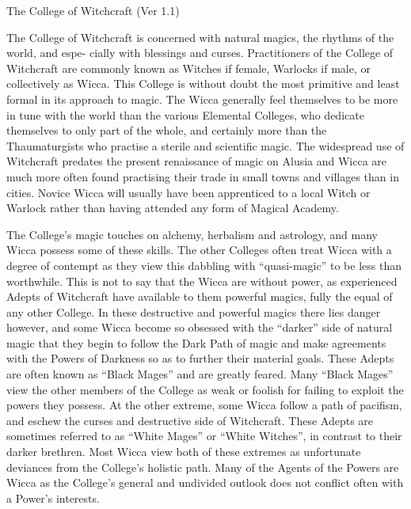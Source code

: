 \begin{Chapter}{The College of Witchcraft (Ver 1.1)}

The College of Witchcraft is concerned with natural magics, the
rhythms of the world, and espe- cially with blessings and curses.
Practitioners of the College of Witchcraft are commonly known as
Witches if female, Warlocks if male, or collectively as Wicca. This
College is without doubt the most primitive and least formal in its
approach to magic.  The Wicca generally feel themselves to be more in
tune with the world than the various Elemental Colleges, who dedicate
themselves to only part of the whole, and certainly more than the
Thaumaturgists who practise a sterile and scientific magic.  The
widespread use of Witchcraft predates the present renaissance of magic
on Alusia and Wicca are much more often found practising their trade
in small towns and villages than in cities.  Novice Wicca will usually
have been apprenticed to a local Witch or Warlock rather than having
attended any form of Magical Academy.

The College’s magic touches on alchemy, herbalism and astrology, and
many Wicca possess some of these skills.  The other Colleges often
treat Wicca with a degree of contempt as they view this dabbling with
“quasi-magic” to be less than worthwhile.  This is not to say that the
Wicca are without power, as experienced Adepts of Witchcraft have
available to them powerful magics, fully the equal of any other
College. In these destructive and powerful magics there lies danger
however, and some Wicca become so obsessed with the “darker” side of
natural magic that they begin to follow the Dark Path of magic and
make agreements with the Powers of Darkness so as to further their
material goals. These Adepts are often known as “Black Mages” and are
greatly feared.  Many “Black Mages” view the other members of the
College as weak or foolish for failing to exploit the powers they
possess.  At the other extreme, some Wicca follow a path of pacifism,
and eschew the curses and destructive side of Witchcraft.  These
Adepts are sometimes referred to as “White Mages” or “White Witches”,
in contrast to their darker brethren.  Most Wicca view both of these
extremes as unfortunate deviances from the College’s holistic path.
Many of the Agents of the Powers are Wicca as the College’s general
and undivided outlook does not conflict often with a Power’s
interests.


\end{Chapter}
